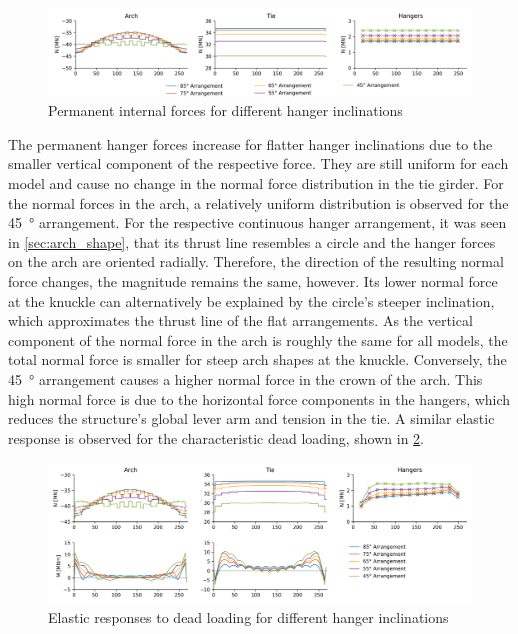 \begin{figure}[H]
    \centering
    \includegraphics[trim={1cm 0 1cm 0},clip, width=\textwidth]{calculations/parallel arrangement comparison/permanent_plot.png}
    \caption{Permanent internal forces for different hanger inclinations}
    \label{fig:inclination_permanent}
\end{figure}

The permanent hanger forces increase for flatter hanger inclinations due to the smaller vertical component of the respective force. They are still uniform for each model and cause no change in the normal force distribution in the tie girder. For the normal forces in the arch, a relatively uniform distribution is observed for the \SI{45}{\degree} arrangement. For the respective continuous hanger arrangement, it was seen in \cref{sec:arch_shape}, that its thrust line resembles a circle and the hanger forces on the arch are oriented radially. Therefore, the direction of the resulting normal force changes, the magnitude remains the same, however. Its lower normal force at the knuckle can alternatively be explained by the circle's steeper inclination, which approximates the thrust line of the flat arrangements. As the vertical component of the normal force in the arch is roughly the same for all models, the total normal force is smaller for steep arch shapes at the knuckle. Conversely, the \SI{45}{\degree} arrangement causes a higher normal force in the crown of the arch. This high normal force is due to the horizontal force components in the hangers, which reduces the structure's global lever arm and tension in the tie. 
A similar elastic response is observed for the characteristic dead loading, shown in \cref{fig:inclination_dead}.
\begin{figure}[H]
    \centering
    \includegraphics[width=\textwidth]{calculations/parallel arrangement comparison/dead load_plot.png}
    \caption{Elastic responses to dead loading for different hanger inclinations}
    \label{fig:inclination_dead}
\end{figure}

